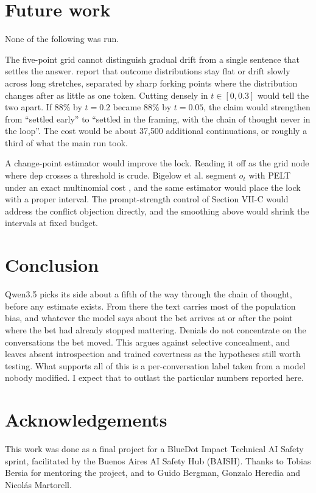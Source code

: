 \documentclass{article}
\begin{document}
\section{Future work}

None of the following was run.

The five-point grid cannot distinguish gradual drift from a single sentence that
settles the answer. \citet{bigelow2026} report that outcome
distributions stay flat or drift slowly across long stretches, separated by sharp
forking points where the distribution changes after as little as one token.
Cutting densely in $t \in [0, 0.3]$ would tell the two apart. If 88\% by $t=0.2$
became 88\% by $t=0.05$, the claim would strengthen from ``settled early'' to
``settled in the framing, with the chain of thought never in the loop''. The cost would be about 37{,}500 additional continuations, or roughly a third of
what the main run took.

A change-point estimator would improve the lock. Reading it off as the grid node where $\mathrm{dep}$ crosses a threshold is
crude. Bigelow et al. segment $o_t$ with PELT under an exact multinomial cost
\citep{killick2012}, and the same estimator would place the lock with a proper
interval. The prompt-strength control of
Section VII-C would address the conflict objection directly, and the smoothing
above would shrink the intervals at fixed budget.

\section{Conclusion}

Qwen3.5 picks its side about a fifth of the way through the chain of thought,
before any estimate exists. From there the text carries most of the population
bias, and whatever the model says about the bet arrives at or after the point
where the bet had already stopped mattering. Denials do not concentrate on the
conversations the bet moved. This argues against selective concealment, and leaves absent introspection and
trained covertness as the hypotheses still worth testing. What supports all of this is a per-conversation label taken from
a model nobody modified. I expect that to outlast the particular numbers reported here.

\section*{Acknowledgements}

This work was done as a final project for a BlueDot Impact Technical AI Safety
sprint, facilitated by the Buenos Aires AI Safety Hub (BAISH). Thanks to Tobias
Bersia for mentoring the project, and to Guido Bergman, Gonzalo Heredia and
Nicol\'as Martorell.
\end{document}
